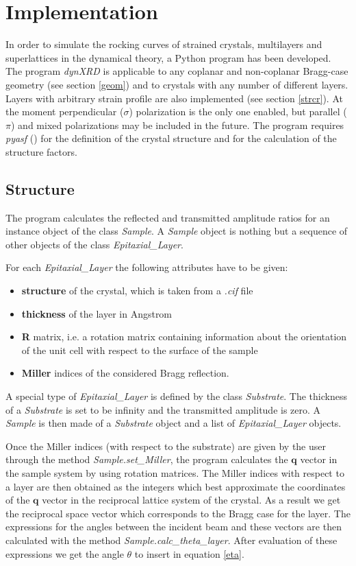 \documentclass[12pt,oneside,notitlepage,abstracton,a4paper]{scrartcl}
\begin{document}
\section{Implementation}

In order to simulate the rocking curves of strained crystals, multilayers and superlattices in the dynamical theory, a Python program has been developed. The program \textit{dynXRD} is applicable to any coplanar and non-coplanar Bragg-case geometry (see section \ref{geom}) and to crystals with any number of different layers. Layers with arbitrary strain profile are also implemented (see section \ref{strcr}). At the moment perpendicular ($\sigma$) polarization is the only one enabled, but parallel ($\pi$) and mixed polarizations may be included in the future. The program requires \textit{pyasf} () for the definition of the crystal structure and for the calculation of the structure factors.


\subsection{Structure}
The program calculates the reflected and transmitted amplitude ratios for an instance object of the class \textit{Sample}. A \textit{Sample} object is nothing but a sequence of other objects of the class \textit{Epitaxial\_Layer}.

For each \textit{Epitaxial\_Layer} the following attributes have to be given:
\begin{itemize}
 \item \textbf{structure} of the crystal, which is taken from a \textit{.cif} file
 \item \textbf{thickness} of the layer in Angstrom
 \item \textbf{R} matrix, i.e. a rotation matrix containing information about the orientation of the unit cell with respect to the surface of the sample
 \item \textbf{Miller} indices of the considered Bragg reflection.
\end{itemize}

A special type of \textit{Epitaxial\_Layer} is defined by the class \textit{Substrate}. The thickness of a \textit{Substrate} is set to be infinity and the transmitted amplitude is zero. A \textit{Sample} is then made of a \textit{Substrate} object and a list of \textit{Epitaxial\_Layer} objects.

Once the Miller indices (with respect to the substrate) are given by the user through the method \textit{Sample.set\_Miller}, the program calculates the $\mathbf{q}$ vector in the sample system by using rotation matrices. The Miller indices with respect to a layer are then obtained as the integers which best approximate the coordinates of the $\mathbf{q}$ vector in the reciprocal lattice system of the crystal. As a result we get the reciprocal space vector which corresponds to the Bragg case for the layer. The expressions for the angles between the incident beam and these vectors are then calculated with the method \textit{Sample.calc\_theta\_layer}. After evaluation of these expressions we get the angle $\theta$ to insert in equation \ref{eta}.
\end{document}
